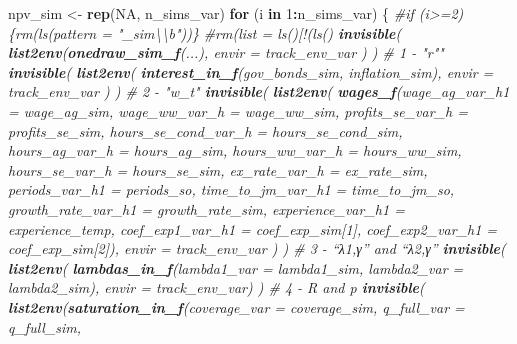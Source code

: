 \documentclass[]{article}
\newenvironment{Shaded}{\begin{snugshade}}{\end{snugshade}}
\newcommand{\CommentTok}[1]{\textcolor[rgb]{0.56,0.35,0.01}{\textit{#1}}}
\newcommand{\ControlFlowTok}[1]{\textcolor[rgb]{0.13,0.29,0.53}{\textbf{#1}}}
\newcommand{\DataTypeTok}[1]{\textcolor[rgb]{0.13,0.29,0.53}{#1}}
\newcommand{\DecValTok}[1]{\textcolor[rgb]{0.00,0.00,0.81}{#1}}
\newcommand{\KeywordTok}[1]{\textcolor[rgb]{0.13,0.29,0.53}{\textbf{#1}}}
\newcommand{\NormalTok}[1]{#1}
\newcommand{\OperatorTok}[1]{\textcolor[rgb]{0.81,0.36,0.00}{\textbf{#1}}}
\newcommand{\OtherTok}[1]{\textcolor[rgb]{0.56,0.35,0.01}{#1}}
\newcommand{\StringTok}[1]{\textcolor[rgb]{0.31,0.60,0.02}{#1}}
\begin{document}
\begin{Shaded}
\begin{Highlighting}[]
\NormalTok{    npv_sim <-}\StringTok{ }\KeywordTok{rep}\NormalTok{(}\OtherTok{NA}\NormalTok{, n_sims_var)}
    \ControlFlowTok{for}\NormalTok{ (i }\ControlFlowTok{in} \DecValTok{1}\OperatorTok{:}\NormalTok{n_sims_var) \{}
    \CommentTok{#if (i>=2) \{rm(ls(pattern = "_sim\textbackslash{}\textbackslash{}b"))\}}
    \CommentTok{#rm(list = ls()[!(ls() %in% (ls(pattern = "_so\textbackslash{}\textbackslash{}b") )])}
    \KeywordTok{invisible}\NormalTok{( }\KeywordTok{list2env}\NormalTok{(}\KeywordTok{onedraw_sim_f}\NormalTok{(...), }\DataTypeTok{envir =}\NormalTok{ track_env_var ) )}
    \CommentTok{# 1 - "r""}
    \KeywordTok{invisible}\NormalTok{( }\KeywordTok{list2env}\NormalTok{( }\KeywordTok{interest_in_f}\NormalTok{(gov_bonds_sim, inflation_sim), }\DataTypeTok{envir =}\NormalTok{ track_env_var ) )}
    \CommentTok{# 2 - "w_t"}
    \KeywordTok{invisible}\NormalTok{( }\KeywordTok{list2env}\NormalTok{( }\KeywordTok{wages_f}\NormalTok{(}\DataTypeTok{wage_ag_var_h1 =}\NormalTok{ wage_ag_sim,}
                           \DataTypeTok{wage_ww_var_h =}\NormalTok{ wage_ww_sim,}
                           \DataTypeTok{profits_se_var_h =}\NormalTok{ profits_se_sim,}
                           \DataTypeTok{hours_se_cond_var_h =}\NormalTok{ hours_se_cond_sim,}
                           \DataTypeTok{hours_ag_var_h =}\NormalTok{ hours_ag_sim,}
                           \DataTypeTok{hours_ww_var_h =}\NormalTok{ hours_ww_sim,}
                           \DataTypeTok{hours_se_var_h =}\NormalTok{ hours_se_sim,}
                           \DataTypeTok{ex_rate_var_h =}\NormalTok{ ex_rate_sim, }
                           \DataTypeTok{periods_var_h1 =}\NormalTok{ periods_so,}
                           \DataTypeTok{time_to_jm_var_h1 =}\NormalTok{ time_to_jm_so, }
                           \DataTypeTok{growth_rate_var_h1 =}\NormalTok{ growth_rate_sim,}
                           \DataTypeTok{experience_var_h1 =}\NormalTok{ experience_temp,}
                           \DataTypeTok{coef_exp1_var_h1 =}\NormalTok{ coef_exp_sim[}\DecValTok{1}\NormalTok{],}
                           \DataTypeTok{coef_exp2_var_h1 =}\NormalTok{ coef_exp_sim[}\DecValTok{2}\NormalTok{]), }\DataTypeTok{envir =}\NormalTok{ track_env_var ) )}
    \CommentTok{# 3 - “λ1,γ” and “λ2,γ”}
    \KeywordTok{invisible}\NormalTok{( }\KeywordTok{list2env}\NormalTok{( }\KeywordTok{lambdas_in_f}\NormalTok{(}\DataTypeTok{lambda1_var =}\NormalTok{ lambda1_sim, }\DataTypeTok{lambda2_var =}\NormalTok{ lambda2_sim), }\DataTypeTok{envir =}\NormalTok{ track_env_var) ) }
    \CommentTok{# 4 - R and p}
    \KeywordTok{invisible}\NormalTok{( }\KeywordTok{list2env}\NormalTok{(}\KeywordTok{saturation_in_f}\NormalTok{(}\DataTypeTok{coverage_var =}\NormalTok{ coverage_sim, }\DataTypeTok{q_full_var =}\NormalTok{ q_full_sim, }
}
\end{Highlighting}
\end{Shaded}
\end{document}
